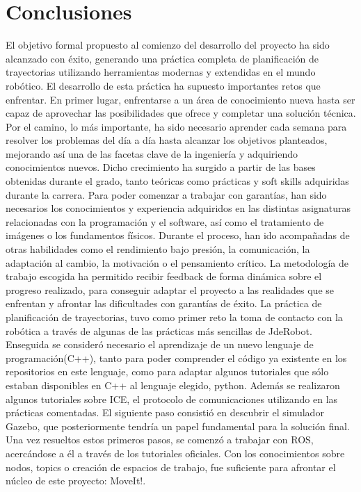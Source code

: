 \documentclass[12pt,spanish,chapterprefix, numbers=noenddot]{book}
\numberwithin{equation}{section}
\numberwithin{figure}{section}
\begin{document}
\section{Conclusiones}
El objetivo formal propuesto al comienzo del desarrollo del proyecto ha sido alcanzado con éxito, generando una práctica completa de planificación de trayectorias utilizando herramientas modernas y extendidas en el mundo robótico. El desarrollo de esta práctica ha supuesto importantes retos que enfrentar. En primer lugar, enfrentarse a un área de conocimiento nueva hasta ser capaz de aprovechar las posibilidades que ofrece y completar una solución técnica. Por el camino, lo más importante, ha sido necesario aprender cada semana para resolver los problemas del día a día hasta alcanzar los objetivos planteados, mejorando así una de las facetas clave de la ingeniería y adquiriendo conocimientos nuevos. 
Dicho crecimiento ha surgido a partir de las bases obtenidas durante el grado, tanto teóricas como prácticas y soft skills adquiridas durante la carrera. Para poder comenzar a trabajar con garantías, han sido necesarios los conocimientos y experiencia adquiridos en las distintas asignaturas relacionadas con la programación y el software, así como el tratamiento de imágenes o los fundamentos físicos. Durante el proceso, han ido acompañadas de otras habilidades como el rendimiento bajo presión, la comunicación, la adaptación al cambio, la motivación o el pensamiento crítico. La metodología de trabajo escogida ha permitido recibir feedback de forma dinámica sobre el progreso realizado, para conseguir adaptar el proyecto a las realidades que se enfrentan y afrontar las dificultades con garantías de éxito.
La práctica de planificación de trayectorias, tuvo como primer reto la toma de contacto con la robótica a través de algunas de las prácticas más sencillas de JdeRobot. Enseguida se consideró necesario el aprendizaje de un nuevo lenguaje de programación(C++), tanto para poder comprender el código ya existente en los repositorios en este lenguaje, como para adaptar algunos tutoriales que sólo estaban disponibles en C++ al lenguaje elegido, python. Además se realizaron algunos tutoriales sobre ICE, el protocolo de comunicaciones utilizando en las prácticas comentadas. El siguiente paso consistió en descubrir el simulador Gazebo, que posteriormente tendría un papel fundamental para la solución final. Una vez resueltos estos primeros pasos, se comenzó a trabajar con ROS, acercándose a él a través de los tutoriales oficiales. Con los conocimientos sobre nodos, topics o creación de espacios de trabajo, fue suficiente para afrontar el núcleo de este proyecto: MoveIt!. 
\end{document}
